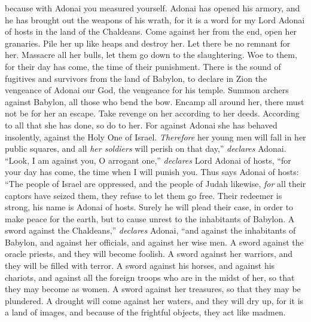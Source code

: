 \begin{biblechapter}
because with Adonai you measured yourself.
\verse Adonai has opened his armory, 
and he has brought out the weapons of his wrath, 
for it is a word for my Lord Adonai of hosts 
in the land of the Chaldeans.
\verse Come against her from the end, 
open her granaries. 
Pile her up like heaps and destroy her. 
Let there be no remnant for her.
\verse Massacre all her bulls, 
let them go down to the slaughtering. 
Woe to them, for their day has come, 
the time of their punishment.
\verse There is the sound of fugitives and survivors 
from the land of Babylon, 
to declare in Zion the vengeance of Adonai our God, 
the vengeance for his temple.
\verse Summon archers against Babylon, 
all those who bend the bow. 
Encamp all around her, 
there must not be for her an escape. 
Take revenge on her according to her deeds. 
According to all that she has done, so do to her. 
For against Adonai she has behaved insolently, 
against the Holy One of Israel.
\verse \textit{Therefore} her young men will fall in her public squares, 
and all \textit{her soldiers} will perish on that day,” \textit{declares} Adonai.
\verse “Look, I am against you, O arrogant one,” 
\textit{declares} Lord Adonai of hosts, 
“for your day has come, 
the time when I will punish you.
\verse Thus says Adonai of hosts:
\verse “The people of Israel are oppressed, 
and the people of Judah likewise, 
\textit{for} all their captors have seized them, 
they refuse to let them go free.
\verse Their redeemer is strong, 
his name is Adonai of hosts. 
Surely he will plead their case, 
in order to make peace for the earth, 
but to cause unrest to the inhabitants of Babylon.
\verse A sword against the Chaldeans,” \textit{declares} Adonai, 
“and against the inhabitants of Babylon, 
and against her officials, 
and against her wise men.
\verse A sword against the oracle priests, 
and they will become foolish. 
A sword against her warriors, 
and they will be filled with terror.
\verse A sword against his horses, 
and against his chariots, 
and against all the foreign troops who are in the midst of her, 
so that they may become as women. 
A sword against her treasures, 
so that they may be plundered.
\verse A drought will come against her waters, 
and they will dry up, 
for it is a land of images, 
and because of the frightful objects, they act like madmen.

\end{biblechapter}
